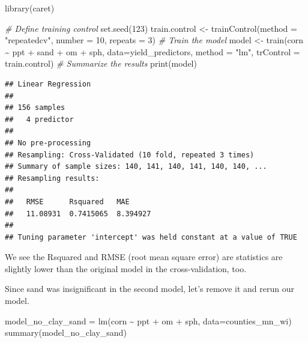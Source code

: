 \documentclass[
]{book}
\newenvironment{Shaded}{\begin{snugshade}}{\end{snugshade}}
\newcommand{\AttributeTok}[1]{\textcolor[rgb]{0.77,0.63,0.00}{#1}}
\newcommand{\CommentTok}[1]{\textcolor[rgb]{0.56,0.35,0.01}{\textit{#1}}}
\newcommand{\DecValTok}[1]{\textcolor[rgb]{0.00,0.00,0.81}{#1}}
\newcommand{\FunctionTok}[1]{\textcolor[rgb]{0.00,0.00,0.00}{#1}}
\newcommand{\NormalTok}[1]{#1}
\newcommand{\OtherTok}[1]{\textcolor[rgb]{0.56,0.35,0.01}{#1}}
\newcommand{\SpecialCharTok}[1]{\textcolor[rgb]{0.00,0.00,0.00}{#1}}
\newcommand{\StringTok}[1]{\textcolor[rgb]{0.31,0.60,0.02}{#1}}
\begin{document}
\begin{Shaded}
\begin{Highlighting}[]
\FunctionTok{library}\NormalTok{(caret)}

\CommentTok{\# Define training control}
\FunctionTok{set.seed}\NormalTok{(}\DecValTok{123}\NormalTok{)}
\NormalTok{train.control }\OtherTok{\textless{}{-}} \FunctionTok{trainControl}\NormalTok{(}\AttributeTok{method =} \StringTok{"repeatedcv"}\NormalTok{, }
                              \AttributeTok{number =} \DecValTok{10}\NormalTok{, }\AttributeTok{repeats =} \DecValTok{3}\NormalTok{)}
\CommentTok{\# Train the model}
\NormalTok{model }\OtherTok{\textless{}{-}} \FunctionTok{train}\NormalTok{(corn }\SpecialCharTok{\textasciitilde{}}\NormalTok{ ppt }\SpecialCharTok{+}\NormalTok{ sand }\SpecialCharTok{+}\NormalTok{ om }\SpecialCharTok{+}\NormalTok{ sph, }\AttributeTok{data=}\NormalTok{yield\_predictors, }\AttributeTok{method =} \StringTok{"lm"}\NormalTok{,}
               \AttributeTok{trControl =}\NormalTok{ train.control)}
\CommentTok{\# Summarize the results}
\FunctionTok{print}\NormalTok{(model)}
\end{Highlighting}
\end{Shaded}

\begin{verbatim}
## Linear Regression 
## 
## 156 samples
##   4 predictor
## 
## No pre-processing
## Resampling: Cross-Validated (10 fold, repeated 3 times) 
## Summary of sample sizes: 140, 141, 140, 141, 140, 140, ... 
## Resampling results:
## 
##   RMSE      Rsquared   MAE     
##   11.08931  0.7415065  8.394927
## 
## Tuning parameter 'intercept' was held constant at a value of TRUE
\end{verbatim}

We see the Rsquared and RMSE (root mean square error) are statistics are slightly lower than the original model in the cross-validation, too.

Since sand was insignificant in the second model, let's remove it and rerun our model.

\begin{Shaded}
\begin{Highlighting}[]
\NormalTok{model\_no\_clay\_sand }\OtherTok{=} \FunctionTok{lm}\NormalTok{(corn }\SpecialCharTok{\textasciitilde{}}\NormalTok{ ppt }\SpecialCharTok{+}\NormalTok{ om }\SpecialCharTok{+}\NormalTok{ sph, }\AttributeTok{data=}\NormalTok{counties\_mn\_wi)}
\FunctionTok{summary}\NormalTok{(model\_no\_clay\_sand)}
\end{Highlighting}
\end{Shaded}
\end{document}
